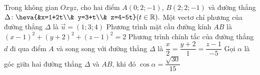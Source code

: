 \begin{ex}%
	Trong không gian $Oxyz$, cho hai điểm $A(0;2;-1)$,  $B(2;2;-1)$ và đường thẳng\\
	$\Delta \colon \heva{&x=1+2t\\& y=3+t\\& z=4-5t}  (t\in\mathbb{R}).$
	 \choiceTF
		{Một vectơ chỉ  phương của đường thẳng $\Delta$ là $\overrightarrow{u}=(1;3;4)$}
		{Phương trình mặt cầu đường kính $AB$ là  $(x-1)^2+(y+2)^2+(z-1)^2=2$}
		{\True Phương  trình chính tắc của đường thẳng $d$ đi qua điểm $A$ và song song với đường thẳng $\Delta$ là $\dfrac{x}{2}=\dfrac{y+2}{1}=\dfrac{z-1}{-5}$}
		{Gọi $\alpha$ là góc  giữa hai đường thẳng $\Delta$ và $AB$, khi đó $\cos\alpha=\dfrac{\sqrt{30}}{15}$}
\end{ex}

